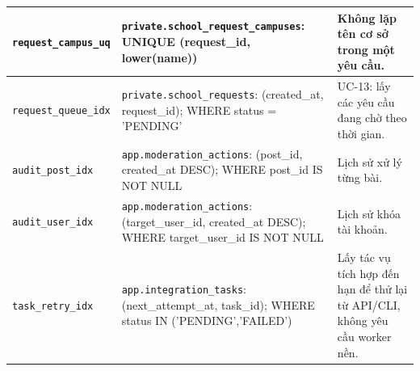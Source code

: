\begin{longtable}{|>{\raggedright\arraybackslash}p{.23\linewidth}|>{\raggedright\arraybackslash}p{.34\linewidth}|>{\raggedright\arraybackslash}p{.35\linewidth}|}
\texttt{request\_\allowbreak{}campus\_\allowbreak{}uq} & \texttt{private.school\_\allowbreak{}request\_\allowbreak{}campuses}: UNIQUE (request\_\allowbreak{}id,\allowbreak{} lower(name)) & Không lặp tên cơ sở trong một yêu cầu. \\ \hline
\texttt{request\_\allowbreak{}queue\_\allowbreak{}idx} & \texttt{private.school\_\allowbreak{}requests}: (created\_\allowbreak{}at,\allowbreak{} request\_\allowbreak{}id); WHERE status = 'PENDING' & UC-13: lấy các yêu cầu đang chờ theo thời gian. \\ \hline
\texttt{audit\_\allowbreak{}post\_\allowbreak{}idx} & \texttt{app.moderation\_\allowbreak{}actions}: (post\_\allowbreak{}id,\allowbreak{} created\_\allowbreak{}at DESC); WHERE post\_\allowbreak{}id IS NOT NULL & Lịch sử xử lý từng bài. \\ \hline
\texttt{audit\_\allowbreak{}user\_\allowbreak{}idx} & \texttt{app.moderation\_\allowbreak{}actions}: (target\_\allowbreak{}user\_\allowbreak{}id,\allowbreak{} created\_\allowbreak{}at DESC); WHERE target\_\allowbreak{}user\_\allowbreak{}id IS NOT NULL & Lịch sử khóa tài khoản. \\ \hline
\texttt{task\_\allowbreak{}retry\_\allowbreak{}idx} & \texttt{app.integration\_\allowbreak{}tasks}: (next\_\allowbreak{}attempt\_\allowbreak{}at,\allowbreak{} task\_\allowbreak{}id); WHERE status IN ('PENDING',\allowbreak{}'FAILED') & Lấy tác vụ tích hợp đến hạn để thử lại từ API/CLI,\allowbreak{} không yêu cầu worker nền. \\ \hline
\end{longtable}
